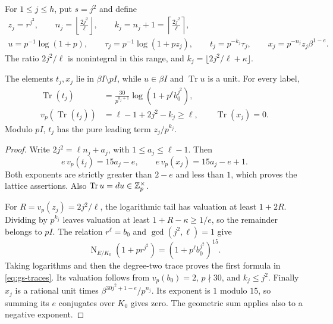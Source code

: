 For $1\le j\le h$, put $s=j^2$ and define
\begin{equation}\label{eq:gs-inputs}
 \begin{gathered}
 z_j=r^{j^2},\qquad
 n_j=\left\lfloor\frac{2j^2}{\ell}\right\rfloor,\qquad
 k_j=n_j+1=\left\lceil\frac{2j^2}{\ell}\right\rceil,\\
 u=p^{-1}\log(1+p),\qquad
 \tau_j=p^{-1}\log(1+pz_j),\qquad
 t_j=p^{-k_j}\tau_j,\qquad
 x_j=p^{-n_j}z_j\beta^{1-e}.
 \end{gathered}
\end{equation}
The ratio $2j^2/\ell$ is nonintegral in this range, and
$k_j=\lfloor2j^2/\ell+\kappa\rfloor$.

\begin{lemma}\label{lem:gs-inputs}
The elements $t_j,x_j$ lie in $\beta I\setminus pI$, while
$u\in\beta I$ and $\operatorname{Tr}u$ is a unit. For every label,
\begin{equation}\label{eq:gs-traces}
 \begin{aligned}
 \operatorname{Tr}(t_j)
   &=\frac{30}{p^{k_j+1}}\log(1+p^\ell b_0^{j^2}),\\
 v_p(\operatorname{Tr}(t_j))
   &=\ell-1+2j^2-k_j\ge\ell,\qquad
 \operatorname{Tr}(x_j)=0.
 \end{aligned}
\end{equation}
Modulo $pI$, $t_j$ has the pure leading term $z_j/p^{k_j}$.
\end{lemma}
\begin{proof}
Write $2j^2=\ell n_j+a_j$, with $1\le a_j\le\ell-1$. Then
\[
 e\,v_p(t_j)=15a_j-e,\qquad
 e\,v_p(x_j)=15a_j-e+1.
\]
Both exponents are strictly greater than $2-e$ and less than $1$,
which proves the lattice assertions. Also
$\operatorname{Tr}u=du\in\mathbb Z_p^\times$.

For $R=v_p(z_j)=2j^2/\ell$, the logarithmic tail has valuation
at least $1+2R$. Dividing by $p^{k_j}$ leaves valuation at least
$1+R-\kappa\ge1/e$, so the remainder belongs to $pI$.
The relation $r^\ell=b_0$ and $\gcd(j^2,\ell)=1$ give
\[
 \operatorname{N}_{E/K_0}(1+pr^{j^2})
       =(1+p^\ell b_0^{j^2})^{15}.
\]
Taking logarithms and then the degree-two trace proves the first
formula in \eqref{eq:gs-traces}. Its valuation follows from
$v_p(b_0)=2$, $p\nmid30$, and $k_j\le j^2$.
Finally $x_j$ is a rational unit times
$\beta^{30j^2+1-e}/p^{n_j}$. Its exponent is $1$ modulo $15$,
so summing its $e$ conjugates over $K_0$ gives zero. The geometric
sum applies also to a negative exponent.
\end{proof}

